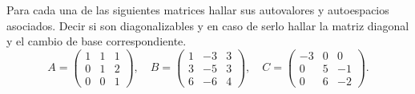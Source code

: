 \item Para cada una de las siguientes matrices hallar sus autovalores y autoespacios asociados. Decir si son diagonalizables y en caso de serlo hallar la matriz diagonal y el cambio de base correspondiente.
    \[A=\begin{pmatrix}
        1&1&1\\0&1&2\\0&0&1
    \end{pmatrix},\quad B=\begin{pmatrix}
        1&-3&3\\3&-5&3\\6&-6&4
    \end{pmatrix},\quad C=\begin{pmatrix}
        -3&0&0\\0&5&-1\\0&6&-2
    \end{pmatrix}.\]
